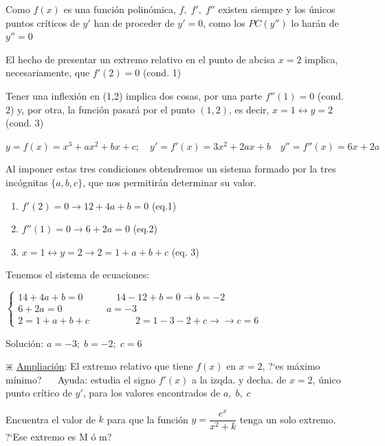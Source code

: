 	\begin{proofw}\renewcommand{\qedsymbol}{$\diamond$}
	
	Como $f(x)$ es una función polinómica, $f,\; f', \; f''$ existen siempre y los únicos puntos críticos de $y'$ han de proceder de $y'=0$, como los $PC(y'')$ lo harán de $y''=0$
	
	El hecho de presentar un extremo relativo en el punto de abcisa $x=2$ implica, necesariamente, que $f'(2)=0$ (cond. 1)
	
	Tener una inflexión en (1,2) implica dos cosas, por una parte $f''(1)=0$ (cond. 2) y, por otra, la función pasará por el punto $(1,2)$, es decir, $x=1 \leftrightarrow y=2$ (cond. 3)
	
	$y=f(x)=x^3+ax^2+bx+c; \quad y'=f'(x)=3x^2+2ax+b \quad y''=f''(x)=6x+2a$
	
	Al imponer estas tres condiciones obtendremos un sistema formado por la tres incógnitas $\{a,b,c\}$, que nos permitirán determinar su valor.
	
	
	
	\begin{enumerate}[Cond. 1. ]	
	\item	$f'(2)=0 \to 12+4a+b=0 $ (eq.1)
	\item   $f''(1)=0 \to 6+2a=0$ (eq.2)
	\item   $x=1 \leftrightarrow y=2 \to 2=1+a+b+c$ (eq. 3)
	\end{enumerate}
	
	Tenemos el sistema de ecuaciones:
	
	$\begin{cases}
	14+4a+b=0 & \quad \quad 14-12+b=0 \to b=-2\\
	6+2a=0 & \quad a=-3\\
	2=1+a+b+c & \quad \quad \quad \quad 2=1-3-2+c \to  \to c=6
	\end{cases}$
	
	Solución: $a=-3; \; b=-2; \; c=6$
	
	$\divideontimes$ \underline{Ampliación}: El extremo relativo que tiene $f(x)$ en $x=2$, ?`es máximo  mínimo? $\quad$ \textcolor{gris}{Ayuda: estudia el signo $f'(x)$ a la izqda. y decha. de $x=2$, único punto crítico de $y'$, para los valores encontrados de $a,\; b,\; c$ }

	\end{proofw}
	
	\begin{ejre}
		Encuentra el valor de $k$ para que la función $y=\dfrac {e^x}{x^2+k}$ tenga un solo extremo. ?`Ese extremo es M ó m?
	\end{ejre}


